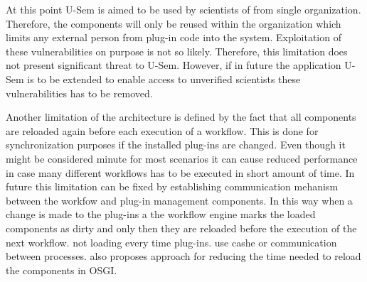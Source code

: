 At this point U-Sem is aimed to be used by scientists of from single organization. Therefore, the components will only be reused within the organization which limits any external person from plug-in code into the system. Exploitation of these vulnerabilities on purpose is not so likely. Therefore, this limitation does not present significant threat to U-Sem. However, if in future the application U-Sem is to be extended to enable access to unverified scientists these vulnerabilities has to be removed. 

Another limitation of the architecture is defined by the fact that all components are reloaded again before each execution of a workflow. This is done for synchronization purposes if the installed plug-ins are changed. Even though it might be considered minute for most scenarios it can cause reduced performance in case many different workflows has to be executed in short amount of time. In future this limitation can be fixed by establishing communication mehanism between the workfow and plug-in management components. In this way when a change is made to the plug-ins a the workflow engine marks the loaded components as dirty and only then they are reloaded before the execution of the next workflow. not loading every time plug-ins. use cashe or communication between processes. \cite{Nikolov} also proposes approach for reducing the time needed to reload the components in OSGI.

